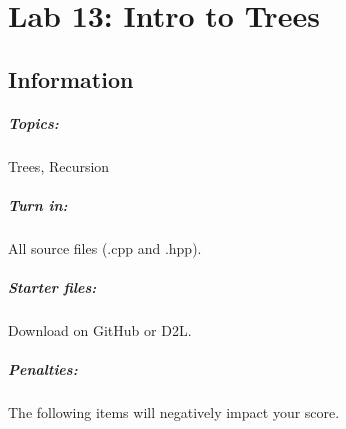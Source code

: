 \documentclass[a4paper,12pt,oneside]{book}
\title{}
\author{Rachel Morris}
\date{\today}
\newcommand{\laLab}{Lab 13: Intro to Trees\ }
\begin{document}
    \chapter*{\laLab} 

        \section{Information}
            \paragraph{ Topics: } Trees, Recursion
            \paragraph{ Turn in: } All source files (.cpp and .hpp).
            \paragraph{ Starter files: } Download on GitHub or D2L.

\renewcommand*\DTstylecomment{\rmfamily\color{green}\textsc}

\begin{framed}
\end{framed}

            \paragraph{ Penalties: }
                The following items will negatively impact your score.
\end{document}
